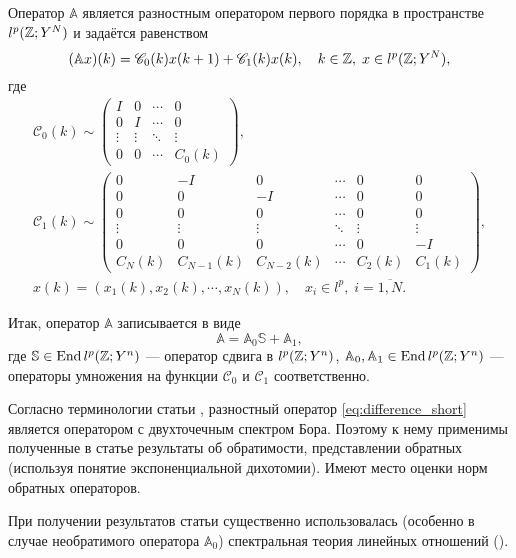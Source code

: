 Оператор $\mathbb A$ является разностным оператором первого порядка в пространстве $l^p(\mathbb{Z}; Y^N)$ и задаётся равенством
\begin{equation}\label{eq:difference_first_order}
(\mathbb A x)(k) = \mathcal C_0(k) x(k + 1) + \mathcal C_1(k) x(k) , \quad k \in \mathbb{Z}, \; x \in l^p(\mathbb{Z}; Y^N),
\end{equation}
где
\begin{gather*}
   \mathcal C_0(k) \sim \begin{pmatrix}
    I & 0 & \cdots &  0 \\
    0 & I  & \cdots &  0 \\
    \vdots & \vdots & \ddots &  \vdots \\
    0 & 0 & \cdots &  C_0(k)
   \end{pmatrix},\\
   \mathcal C_1(k) \sim \begin{pmatrix}
    0 & -I & 0  & \cdots & 0 & 0 \\
    0 & 0  & -I & \cdots & 0 & 0 \\
    0 & 0  & 0 & \cdots & 0 & 0 \\
    \vdots & \vdots & \vdots & \ddots & \vdots & \vdots \\
    0 & 0 & 0 & \cdots & 0 & -I \\
    C_N(k) & C_{N-1}(k) & C_{N-2}(k) & \cdots & C_2(k) & C_1(k)
   \end{pmatrix},\\[0.5em]
   x(k) = (x_1(k), x_2(k), \cdots, x_N(k)), \quad x_i \in l^p, \; i = \overline{1,N}.
\end{gather*}

Итак, оператор $\mathbb A$ записывается в виде
\begin{equation}\label{eq:difference_short}
    \mathbb A = \mathbb A_0 \mathbb S + \mathbb A_1,
\end{equation}
где $\mathbb S \in \operatorname{End} l^p(\mathbb{Z}; Y^n)$ --- оператор сдвига в $l^p(\mathbb{Z}; Y^n)$, $\mathbb A_0, \mathbb A_1 \in \operatorname{End} l^p(\mathbb{Z}; Y^n)$ --- операторы умножения на функции $\mathcal C_0$ и $\mathcal C_1$ соответственно.

Согласно терминологии статьи \cite{bohr2005}, разностный оператор \ref{eq:difference_short} является оператором с двухточечным спектром Бора. Поэтому к нему применимы полученные в статье результаты об обратимости, представлении обратных (используя понятие экспоненциальной дихотомии). Имеют место оценки норм обратных операторов.

При получении результатов статьи \cite{bohr2005} существенно использовалась (особенно в случае необратимого оператора $\mathbb A_0$) спектральная теория линейных отношений (\cite{relations2002, relations2008}). 

